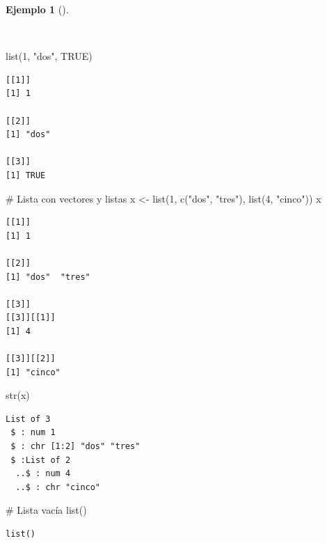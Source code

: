 \documentclass[
  spanish,
  a4paper,
]{scrreport}
\newenvironment{Shaded}{\begin{snugshade}}{\end{snugshade}}
\newcommand{\CommentTok}[1]{\textcolor[rgb]{0.37,0.37,0.37}{#1}}
\newcommand{\ConstantTok}[1]{\textcolor[rgb]{0.56,0.35,0.01}{#1}}
\newcommand{\DecValTok}[1]{\textcolor[rgb]{0.68,0.00,0.00}{#1}}
\newcommand{\FunctionTok}[1]{\textcolor[rgb]{0.28,0.35,0.67}{#1}}
\newcommand{\NormalTok}[1]{\textcolor[rgb]{0.00,0.23,0.31}{#1}}
\newcommand{\OtherTok}[1]{\textcolor[rgb]{0.00,0.23,0.31}{#1}}
\newcommand{\StringTok}[1]{\textcolor[rgb]{0.13,0.47,0.30}{#1}}
\theoremstyle{definition}
\theoremstyle{definition}
\newtheorem{example}{Ejemplo}[chapter]
\theoremstyle{remark}
\begin{document}
\begin{example}[]\protect\hypertarget{exm-creacion-listas}{}\label{exm-creacion-listas}

~

\begin{Shaded}
\begin{Highlighting}[]
\FunctionTok{list}\NormalTok{(}\DecValTok{1}\NormalTok{, }\StringTok{"dos"}\NormalTok{, }\ConstantTok{TRUE}\NormalTok{)}
\end{Highlighting}
\end{Shaded}

\begin{verbatim}
[[1]]
[1] 1

[[2]]
[1] "dos"

[[3]]
[1] TRUE
\end{verbatim}

\begin{Shaded}
\begin{Highlighting}[]
\CommentTok{\# Lista con vectores y listas}
\NormalTok{x }\OtherTok{\textless{}{-}} \FunctionTok{list}\NormalTok{(}\DecValTok{1}\NormalTok{, }\FunctionTok{c}\NormalTok{(}\StringTok{"dos"}\NormalTok{, }\StringTok{"tres"}\NormalTok{), }\FunctionTok{list}\NormalTok{(}\DecValTok{4}\NormalTok{, }\StringTok{"cinco"}\NormalTok{))}
\NormalTok{x}
\end{Highlighting}
\end{Shaded}

\begin{verbatim}
[[1]]
[1] 1

[[2]]
[1] "dos"  "tres"

[[3]]
[[3]][[1]]
[1] 4

[[3]][[2]]
[1] "cinco"
\end{verbatim}

\begin{Shaded}
\begin{Highlighting}[]
\FunctionTok{str}\NormalTok{(x)}
\end{Highlighting}
\end{Shaded}

\begin{verbatim}
List of 3
 $ : num 1
 $ : chr [1:2] "dos" "tres"
 $ :List of 2
  ..$ : num 4
  ..$ : chr "cinco"
\end{verbatim}

\begin{Shaded}
\begin{Highlighting}[]
\CommentTok{\# Lista vacía}
\FunctionTok{list}\NormalTok{()}
\end{Highlighting}
\end{Shaded}

\begin{verbatim}
list()
\end{verbatim}

\end{example}
\end{document}
